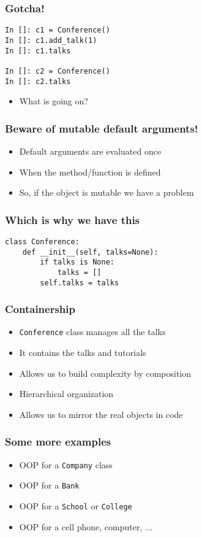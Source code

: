 \documentclass[14pt,compress,aspectratio=169]{beamer}
\begin{document}
\begin{frame}[fragile]
  \frametitle{Gotcha!}
\begin{lstlisting}
In []: c1 = Conference()
In []: c1.add_talk(1)
In []: c1.talks

In []: c2 = Conference()
In []: c2.talks

\end{lstlisting}

  \begin{itemize}
  \item What is going on?
  \end{itemize}
\end{frame}

\begin{frame}
  \frametitle{Beware of mutable default arguments!}
  \begin{itemize}
  \item Default arguments are evaluated once
  \item When the method/function is defined
  \item So, if the object is mutable we have a problem
  \end{itemize}
\end{frame}

\begin{frame}[fragile]
  \frametitle{Which is why we have this}
\begin{lstlisting}
class Conference:
    def __init__(self, talks=None):
        if talks is None:
            talks = []
        self.talks = talks
\end{lstlisting}
\end{frame}

\begin{frame}
  \frametitle{Containership}
  \begin{itemize}
  \item \lstinline{Conference} class manages all the talks
  \item It contains the talks and tutorials
  \item Allows us to build complexity by \alert{composition}
  \item Hierarchical organization
  \item Allows us to mirror the real objects in code
  \end{itemize}
\end{frame}

\begin{frame}
  \frametitle{Some more examples}
  \begin{itemize}
  \item OOP for a \lstinline{Company} class
  \item OOP for a \lstinline{Bank}
  \item OOP for a \lstinline{School} or \lstinline{College}
  \item OOP for a cell phone, computer, ...
  \end{itemize}
\end{frame}
\end{document}

